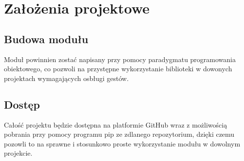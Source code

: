 \chapter{Założenia projektowe}

\section{Budowa modułu}
Moduł powinnien zostać napisany przy pomocy paradygmatu programowania
obiektowego, co pozwoli na przystępne wykorzystanie biblioteki w dowonych 
projektach wymagających osbługi gestów. 

\section{Dostęp}
Całość projektu będzie dostępna na platformie GitHub wraz z możliwością 
pobrania przy pomocy programu pip ze zdlanego repozytorium, dzięki czemu 
pozowli to na sprawne i stosunkowo proste wykorzystanie modułu w dowolnym 
projekcie. 